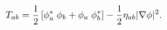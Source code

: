 \begin{equation}
T_{ab} = 
{1\over2}\left[\phi_a^* \; \phi_b+ \phi_a \; \phi_b^*\right]  
- 
{1\over2} \eta_{ab} |\nabla \phi|^2.
\end{equation}


